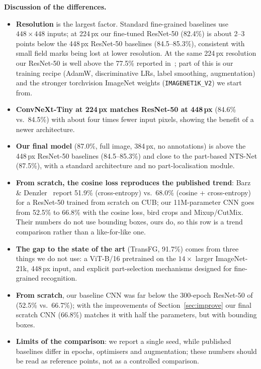 \documentclass[11pt,a4paper]{article}
\begin{document}
\textbf{Discussion of the differences.}
\begin{itemize}
\item \textbf{Resolution} is the largest factor. Standard fine-grained baselines use $448\times448$ inputs; at 224\,px our
fine-tuned ResNet-50 (82.4\%) is about 2--3 points below the 448\,px ResNet-50 baselines (84.5--85.3\%), consistent
with small field marks being lost at lower resolution. At the same 224\,px resolution our ResNet-50 is well above the 77.5\%
reported in~\cite{posthoc}; part of this is our training recipe (AdamW, discriminative LRs, label smoothing, augmentation)
and the stronger torchvision ImageNet weights (\texttt{IMAGENET1K\_V2}) we start from.
\item \textbf{ConvNeXt-Tiny at 224\,px matches ResNet-50 at 448\,px} (84.6\% vs.\ 84.5\%) with about four times fewer input
pixels, showing the benefit of a newer architecture.
\item \textbf{Our final model} (87.0\%, full image, 384\,px, no annotations) is above the 448\,px ResNet-50 baselines
(84.5--85.3\%) and close to the part-based NTS-Net (87.5\%), with a standard architecture and no part-localisation module.
\item \textbf{From scratch, the cosine loss reproduces the published trend}: Barz \& Denzler~\cite{cosine} report 51.9\%
(cross-entropy) vs.\ 68.0\% (cosine + cross-entropy) for a ResNet-50 trained from scratch on CUB; our 11M-parameter CNN goes from
52.5\% to 66.8\% with the cosine loss, bird crops and Mixup/CutMix. Their numbers do not use bounding boxes, ours do, so this row is
a trend comparison rather than a like-for-like one.
\item \textbf{The gap to the state of the art} (TransFG, 91.7\%) comes from three things we do not use: a ViT-B/16 pretrained on the
$14\times$ larger ImageNet-21k, 448\,px input, and explicit part-selection mechanisms designed for fine-grained recognition.
\item \textbf{From scratch}, our baseline CNN was far below the 300-epoch ResNet-50 of~\cite{featmining} (52.5\% vs.\ 66.7\%); with
the improvements of Section~\ref{sec:improve} our final scratch CNN (66.8\%) matches it with half the parameters, but with bounding boxes.
\item \textbf{Limits of the comparison}: we report a single seed, while published baselines differ in epochs, optimisers and
augmentation; these numbers should be read as reference points, not as a controlled comparison.
\end{itemize}
\end{document}

